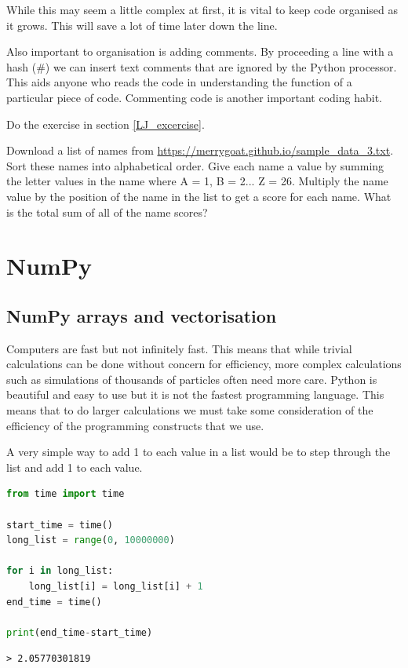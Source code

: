 While this may seem a little complex at first, it is vital to keep code organised as it grows. This will save a lot of time later down the line. 

Also important to organisation is adding comments. By proceeding a line with a hash (\#) we can insert text comments that are ignored by the Python processor. This aids anyone who reads the code in understanding the function of a particular piece of code. Commenting code is another important coding habit.
\begin{task}Do the exercise in section \ref{LJ_excercise}.\end{task}
\begin{advancedtask} Download a list of names from \url{https://merrygoat.github.io/sample_data_3.txt}. Sort these names into alphabetical order. Give each name a value by summing the letter values in the name where A = 1, B = 2... Z = 26. Multiply the name value by the position of the name in the list to get a score for each name. What is the total sum of all of the name scores?\end{advancedtask}

\section{NumPy}
	\subsection{NumPy arrays and vectorisation}
	Computers are fast but not infinitely fast. This means that while trivial calculations can be done without concern for efficiency, more complex calculations such as simulations of thousands of particles often need more care. Python is beautiful and easy to use but it is not the fastest programming language. This means that to do larger calculations we must take some consideration of the efficiency of the programming constructs that we use.

	A very simple way to add 1 to each value in a list would be to step through the list and add 1 to each value.
	\begin{lstlisting}[language=Python]
from time import time

start_time = time()
long_list = range(0, 10000000)

for i in long_list:
	long_list[i] = long_list[i] + 1
end_time = time()

print(end_time-start_time)\end{lstlisting}
	\begin{verbatim}> 2.05770301819\end{verbatim}

